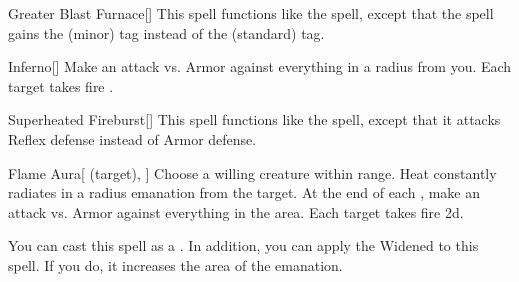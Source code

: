 \lowercase{\hypertarget{spell:Greater Blast Furnace}{}}\label{spell:Greater Blast Furnace}
\begin{apability}[\nth{3}]{\hypertarget{spell:Greater Blast Furnace}{Greater Blast Furnace}}[]
This spell functions like the  spell, except that the spell gains the  (minor) tag instead of the  (standard) tag.
\end{apability}
\vspace{0.25em}



\lowercase{\hypertarget{spell:Inferno}{}}\label{spell:Inferno}
\begin{apability}[\nth{3}]{\hypertarget{spell:Inferno}{Inferno}}[]
Make an attack vs. Armor against everything in a \arealarge radius from you.
\hit Each target takes fire .
\end{apability}
\vspace{0.25em}



\lowercase{\hypertarget{spell:Superheated Fireburst}{}}\label{spell:Superheated Fireburst}
\begin{apability}[\nth{3}]{\hypertarget{spell:Superheated Fireburst}{Superheated Fireburst}}[]
This spell functions like the  spell, except that it attacks Reflex defense instead of Armor defense.
\end{apability}
\vspace{0.25em}



\lowercase{\hypertarget{spell:Flame Aura}{}}\label{spell:Flame Aura}
\begin{attuneability}[\nth{4}]{\hypertarget{spell:Flame Aura}{Flame Aura}}[ (target), ]
Choose a willing creature within \rngclose range.
Heat constantly radiates in a \areamed radius emanation from the target.
At the end of each , make an attack vs. Armor against everything in the area.
\hit Each target takes fire  \minus2d.

You can cast this spell as a .
In addition, you can apply the Widened  to this spell.
If you do, it increases the area of the emanation.
\end{attuneability}
\vspace{0.25em}



